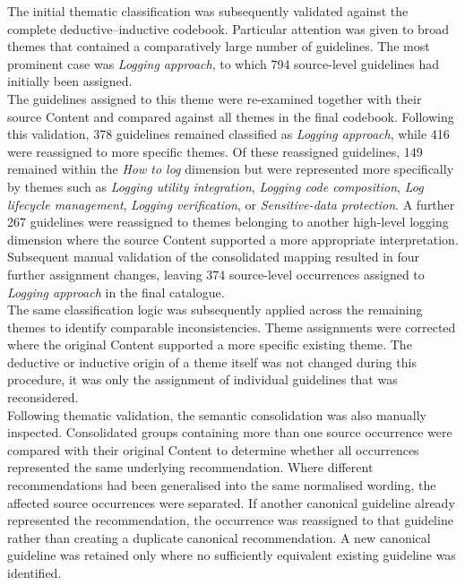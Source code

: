 The initial thematic classification was subsequently validated against the complete
deductive--inductive codebook. Particular attention was given to broad themes that 
contained a comparatively large number of guidelines. The most prominent case 
was \textit{Logging approach}, to which 794 source-level guidelines had initially been assigned.
\\
The guidelines assigned to this theme were re-examined together with their source Content
and compared against all themes in the final codebook. Following this validation, 378 guidelines
remained classified as \textit{Logging approach}, while 416 were reassigned to more specific themes.
Of these reassigned guidelines, 149 remained within the \textit{How to log} dimension but were
represented more specifically by themes such as \textit{Logging utility integration},
\textit{Logging code composition}, \textit{Log lifecycle management}, \textit{Logging verification},
or \textit{Sensitive-data protection}. A further 267 guidelines were reassigned to themes belonging
to another high-level logging dimension where the source Content supported a more appropriate
interpretation.
\\
Subsequent manual validation of the consolidated mapping resulted in four further
assignment changes, leaving 374 source-level occurrences assigned to
\textit{Logging approach} in the final catalogue.
\\
The same classification logic was subsequently applied across the remaining themes to identify
comparable inconsistencies. Theme assignments were corrected where the original Content supported
a more specific existing theme. The deductive or inductive origin of a theme itself was not changed
during this procedure, it was only the assignment of individual guidelines that was reconsidered.
\\
Following thematic validation, the semantic consolidation was also manually inspected.
Consolidated groups containing more than one source occurrence were compared with their
original Content to determine whether all occurrences represented the same underlying recommendation. 
Where different recommendations had been generalised into the same normalised wording, the affected source 
occurrences were separated. If another canonical guideline already represented the recommendation, 
the occurrence was reassigned to that guideline rather than creating a duplicate canonical recommendation. 
A new canonical guideline was retained only where no sufficiently equivalent existing guideline was identified.
\\
